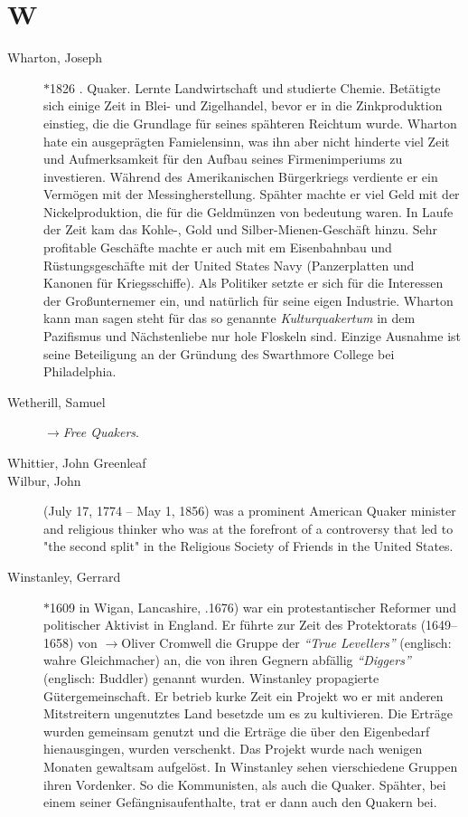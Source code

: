 \section*{W}

\articlesize

\begin{description}

 \item[Wharton, Joseph] $\ast$1826 . Quaker. Lernte Landwirtschaft
 und studierte Chemie. Betätigte sich einige Zeit in Blei- und Zigelhandel,
 bevor er in die Zinkproduktion einstieg, die die Grundlage für seines
 spähteren Reichtum wurde. Wharton hate ein ausgeprägten Famielensinn, was ihn
 aber nicht hinderte viel Zeit und Aufmerksamkeit für den Aufbau seines
 Firmenimperiums zu investieren. Während des Amerikanischen Bürgerkriegs
 verdiente er ein Vermögen mit der Messingherstellung. Spähter machte er viel
 Geld mit der Nickelproduktion, die für die Geldmünzen von bedeutung waren.
 In Laufe der Zeit kam das Kohle-, Gold und Silber-Mienen-Geschäft hinzu.
 Sehr profitable Geschäfte machte er auch mit em Eisenbahnbau und
 Rüstungsgeschäfte mit der United States Navy (Panzerplatten und Kanonen
 für Kriegsschiffe). Als Politiker setzte er sich für die Interessen der
 Großunternemer ein, und natürlich für seine eigen Industrie. Wharton kann
 man sagen steht für das so genannte \textit{Kulturquakertum} in dem
 Pazifismus und Nächstenliebe nur hole Floskeln sind. Einzige Ausnahme ist
 seine Beteiligung an der Gründung des Swarthmore College bei Philadelphia.


 \item[Wetherill, Samuel] $\to$\textit{Free Quakers}.

 \item[Whittier, John Greenleaf]

 \item[Wilbur, John] (July 17, 1774 – May 1, 1856) was a prominent American Quaker minister and religious thinker who was at the forefront of a controversy that led to "the second split" in the Religious Society of Friends in the United States.

 \item[Winstanley, Gerrard] $\ast$1609 in Wigan, Lancashire, .1676) war
 ein protestantischer Reformer und politischer Aktivist in England. Er führte
 zur Zeit des Protektorats (1649–1658) von $\to$Oliver Cromwell die Gruppe der
 \textit{"`True Levellers"'} (englisch: wahre Gleichmacher) an, die von ihren
 Gegnern abfällig \textit{"`Diggers"'} (englisch: Buddler) genannt wurden.
 Winstanley propagierte
 Gütergemeinschaft. Er betrieb kurke Zeit ein Projekt wo er mit anderen Mitstreitern
ungenutztes Land besetzde um es zu kultivieren. Die Erträge wurden gemeinsam
genutzt und die Erträge die über den Eigenbedarf hienausgingen, wurden verschenkt.
Das Projekt wurde nach wenigen Monaten gewaltsam aufgelöst. In Winstanley sehen
vierschiedene Gruppen ihren Vordenker. So die Kommunisten, als auch die Quaker.
Spähter, bei einem seiner Gefängnisaufenthalte, trat er dann auch den Quakern
bei. 


\end{description}
